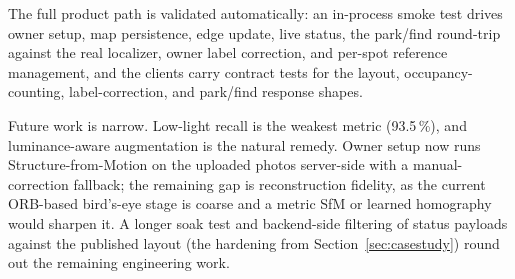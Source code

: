 \documentclass[10pt,twocolumn,letterpaper]{article}
\begin{document}
The full product path is validated automatically: an in-process smoke test
drives owner setup, map persistence, edge update, live status, the
park/find round-trip against the real localizer, owner label correction,
and per-spot reference management, and the clients carry contract tests for
the layout, occupancy-counting, label-correction, and park/find response
shapes.

Future work is narrow. Low-light recall is the weakest metric (93.5\,\%),
and luminance-aware augmentation is the natural remedy. Owner setup now runs
Structure-from-Motion on the uploaded photos server-side with a
manual-correction fallback; the remaining gap is reconstruction fidelity,
as the current ORB-based bird's-eye stage is coarse and a metric SfM or
learned homography would sharpen it. A longer soak test and backend-side
filtering of status payloads against the published layout (the hardening
from Section~\ref{sec:casestudy}) round out the remaining engineering work.

{\small


}
\end{document}
